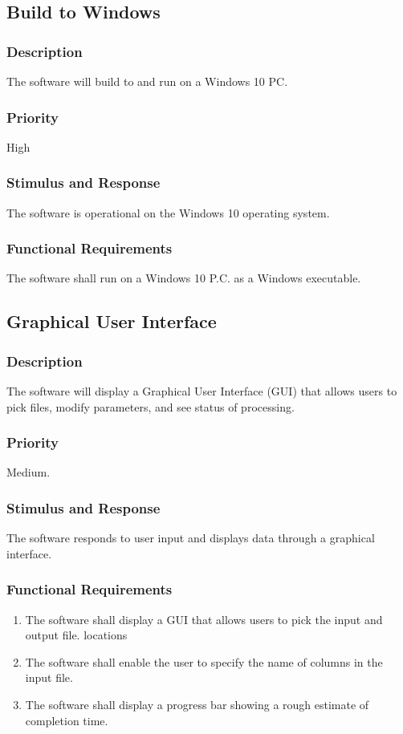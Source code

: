 \subsection{Build to Windows}
\subsubsection{Description}

 The software will build to and run on a Windows 10 PC.
\subsubsection{Priority}
High
\subsubsection{Stimulus and Response}
The software is operational on the Windows 10 operating system.
\subsubsection{Functional Requirements}
The software shall run on a Windows 10 P.C. as a Windows executable.

  \subsection{Graphical User Interface}
\subsubsection{Description}
 The software will display a Graphical User Interface (GUI) that allows users to pick files, modify parameters, and see status of processing.
\subsubsection{Priority}
Medium.

\subsubsection{Stimulus and Response}
The software responds to user input and displays data through a graphical interface.

\subsubsection{Functional Requirements}
\begin{enumerate}
 \item The software shall display a GUI that allows users to pick the input and output file. locations
 \item  The software shall enable the user to specify the name of columns in the input file.

 \item The software shall display a progress bar showing a rough estimate of completion time.
\end{enumerate}
 
